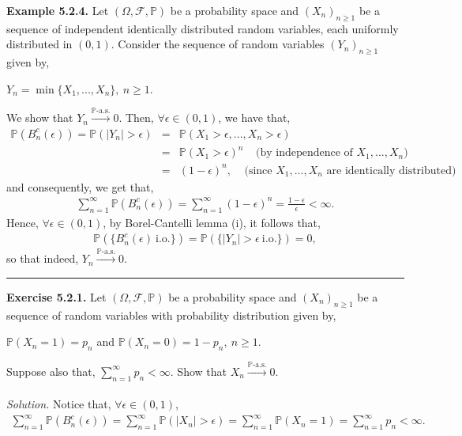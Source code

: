 \documentclass{article}
\begin{document}
\textbf{Example 5.2.4.} Let $(\Omega,\mathcal{F},\mathbb{P})$ be a probability space and $(X_n)_{n\geq1}$ be a sequence of independent identically distributed random variables, each uniformly distributed in $(0,1)$. Consider the sequence of random variables $(Y_n)_{n\geq1}$ given by,
\begin{center}
	$Y_n = \min\{X_1,...,X_n\}, \ n\geq1$.
\end{center}
We show that $Y_n \xrightarrow{\mathbb{P}\text{-a.s.}} 0$. Then, $\forall \epsilon \in (0,1)$, we have that,
\begin{eqnarray}
	\nonumber
	\mathbb{P}(B_n^c(\epsilon)) = \mathbb{P}(|Y_n| > \epsilon) &=& \mathbb{P}(X_1 > \epsilon,...,X_n > \epsilon)\\
	\nonumber
	&=& \mathbb{P}(X_1 > \epsilon)^n \ \ \ \ \ \text{(by independence of $X_1,...,X_n$)}\\
	\nonumber
	&=& (1-\epsilon)^n, \ \ \ \ \ \text{(since $X_1,...,X_n$ are identically distributed)}
\end{eqnarray}
and consequently, we get that,
\begin{eqnarray}
\nonumber
\sum_{n=1}^{\infty}\mathbb{P}(B_n^c(\epsilon)) = \sum_{n=1}^{\infty}(1-\epsilon)^n = \frac{1-\epsilon}{\epsilon} < \infty.
\end{eqnarray}
Hence, $\forall \epsilon\in(0,1)$, by Borel-Cantelli lemma (i), it follows that,
\begin{eqnarray}
\nonumber
\mathbb{P}(\{B_n^c(\epsilon) \ \text{i.o.}\}) = \mathbb{P}(\{|Y_n| > \epsilon \ \text{i.o.}\}) = 0,
\end{eqnarray}
so that indeed, $Y_n \xrightarrow{\mathbb{P}\text{-a.s.}} 0$.
\begin{center}
	\noindent\rule{12cm}{0.4pt}
\end{center}
\textbf{Exercise 5.2.1.} Let $(\Omega,\mathcal{F},\mathbb{P})$ be a probability space and $(X_n)_{n\geq1}$ be a sequence of random variables with probability distribution given by,
\begin{center}
	$\mathbb{P}(X_n = 1) = p_n$ and $\mathbb{P}(X_n = 0) = 1 - p_n, \ n\geq1$.
\end{center}
Suppose also that, $\sum_{n=1}^{\infty}p_n < \infty$. Show that $X_n \xrightarrow{\mathbb{P}\text{-a.s.}} 0$.\\\\
\textit{Solution.} Notice that, $\forall \epsilon \in (0,1)$,
\begin{eqnarray}
\nonumber
\sum_{n=1}^{\infty}\mathbb{P}(B_n^c(\epsilon)) = \sum_{n=1}^{\infty}\mathbb{P}(|X_n| > \epsilon) = \sum_{n=1}^{\infty}\mathbb{P}(X_n = 1) = \sum_{n=1}^{\infty}p_n < \infty.
\end{eqnarray}
\end{document}
